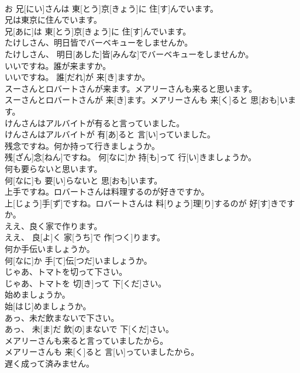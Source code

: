 \documentclass[8pt]{extreport}
\begin{document}
\begin{CJK}{UTF8}{min}
\\	お 兄[にい]さんは 東[とう]京[きょう]に 住[す]んでいます。
\\	兄は東京に住んでいます。	
\\	兄[あに]は 東[とう]京[きょう]に 住[す]んでいます。
\\	たけしさん、明日皆でバーベキューをしませんか。	
\\	たけしさん、 明日[あした]皆[みんな]でバーベキューをしませんか。
\\	いいですね。誰が来ますか。	
\\	いいですね。 誰[だれ]が 来[き]ますか。
\\	スーさんとロバートさんが来ます。メアリーさんも来ると思います。	
\\	スーさんとロバートさんが 来[き]ます。メアリーさんも 来[く]ると 思[おも]います。
\\	けんさんはアルバイトが有ると言っていました。	
\\	けんさんはアルバイトが 有[あ]ると 言[い]っていました。
\\	残念ですね。何か持って行きましょうか。	
\\	残[ざん]念[ねん]ですね。 何[なに]か 持[も]って 行[い]きましょうか。
\\	何も要らないと思います。	
\\	何[なに]も 要[い]らないと 思[おも]います。
\\	上手ですね。ロバートさんは料理するのが好きですか。	
\\	上[じょう]手[ず]ですね。ロバートさんは 料[りょう]理[り]するのが 好[す]きですか。
\\	ええ、良く家で作ります。	
\\	ええ、 良[よ]く 家[うち]で 作[つく]ります。
\\	何か手伝いましょうか。	
\\	何[なに]か 手[て]伝[つだ]いましょうか。
\\	じゃあ、トマトを切って下さい。	
\\	じゃあ、トマトを 切[き]って 下[くだ]さい。
\\	始めましょうか。	
\\	始[はじ]めましょうか。
\\	あっ、未だ飲まないで下さい。	
\\	あっ、 未[ま]だ 飲[の]まないで 下[くだ]さい。
\\	メアリーさんも来ると言っていましたから。	
\\	メアリーさんも 来[く]ると 言[い]っていましたから。
\\	遅く成って済みません。	

\end{CJK}
\end{document}
